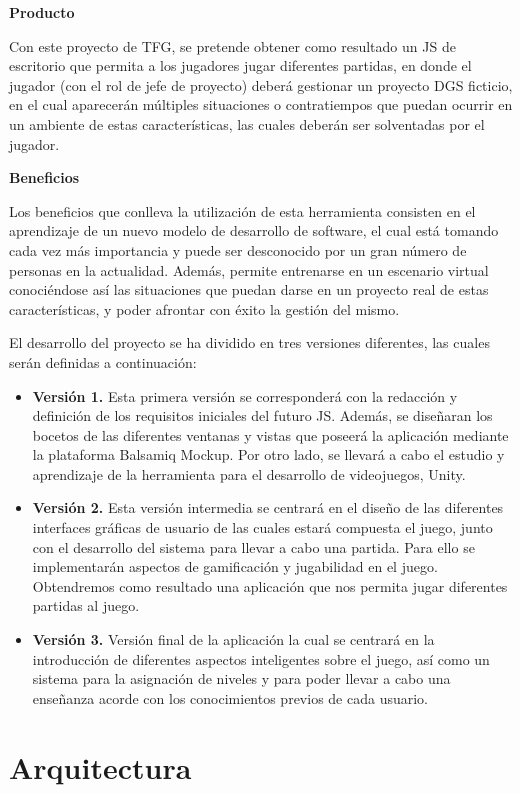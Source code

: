 \textbf{Producto}

Con este proyecto de TFG, se pretende obtener como resultado un JS de escritorio que permita a los jugadores jugar diferentes partidas, en donde el jugador (con el rol de jefe de proyecto) deberá gestionar un proyecto DGS ficticio, en el cual aparecerán múltiples situaciones o contratiempos que puedan ocurrir en un ambiente de estas características, las cuales deberán ser solventadas por el jugador.

\textbf{Beneficios}

Los beneficios que conlleva la utilización de esta herramienta consisten en el aprendizaje de un nuevo modelo de desarrollo de software, el cual está tomando cada vez más importancia y puede ser desconocido por un gran número de personas en la actualidad. Además, permite entrenarse en un escenario virtual conociéndose así las situaciones que puedan darse en un proyecto real de estas características, y poder afrontar con éxito la gestión del mismo.

El desarrollo del proyecto se ha dividido en tres versiones diferentes, las cuales serán definidas a continuación:

\begin{itemize}
	\item \textbf{Versión 1.} Esta primera versión se corresponderá con la redacción y definición de los requisitos iniciales del futuro JS. Además, se diseñaran los bocetos de las diferentes ventanas y vistas que poseerá la aplicación mediante la plataforma Balsamiq Mockup. Por otro lado, se llevará a cabo el estudio y aprendizaje de la herramienta para el desarrollo de videojuegos, Unity.
	\item \textbf{Versión 2.} Esta versión intermedia se centrará en el diseño de las diferentes interfaces gráficas de usuario de las cuales estará compuesta el juego, junto con el desarrollo del sistema para llevar a cabo una partida. Para ello se implementarán aspectos de gamificación y jugabilidad en el juego. Obtendremos como resultado una aplicación que nos permita jugar diferentes partidas al juego.
	\item \textbf{Versión 3.} Versión final de la aplicación la cual se centrará en la introducción de diferentes aspectos inteligentes sobre el juego, así como un sistema para la asignación de niveles y para poder llevar a cabo una enseñanza acorde con los conocimientos previos de cada usuario.
\end{itemize}

\section{Arquitectura}
\label{sec:Arquitectura}

